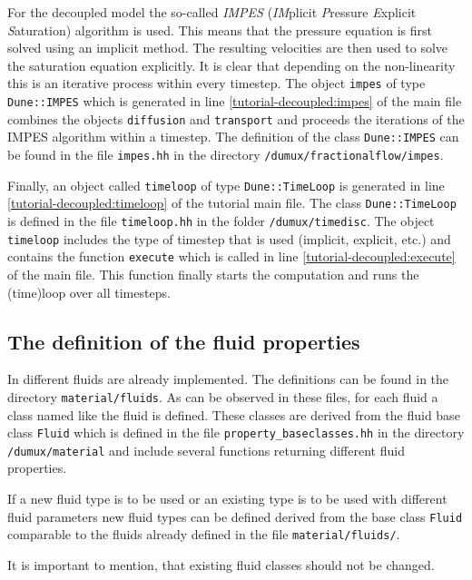 For the decoupled model the so-called \textit{IMPES} (\textit{IM}plicit \textit{P}ressure \textit{E}xplicit \textit{S}aturation) algorithm is used. This means that the pressure equation is first solved using an implicit method. The resulting velocities are then used to solve the saturation equation explicitly. It is clear that depending on the non-linearity this is an iterative process within every timestep. The object \texttt{impes} of type \texttt{Dune::IMPES} which is generated in line \ref{tutorial-decoupled:impes} of the main file combines the objects \texttt{diffusion} and \texttt{transport} and proceeds the iterations of the IMPES algorithm within a timestep. The definition of the class \texttt{Dune::IMPES} can be found in the file \texttt{impes.hh} in the directory \texttt{/dumux/fractionalflow/impes}.

Finally, an object called \texttt{timeloop} of type \texttt{Dune::TimeLoop} is generated in line \ref{tutorial-decoupled:timeloop} of the tutorial main file. The class \texttt{Dune::TimeLoop} is defined in the file \texttt{timeloop.hh} in the folder \texttt{/dumux/timedisc}. The object \texttt{timeloop} includes the type of timestep that is used (implicit, explicit, etc.) and contains the function \texttt{execute} which is called in line \ref{tutorial-decoupled:execute} of the main file. This function finally starts the computation and runs the (time)loop over all timesteps.

\subsection{The definition of the fluid properties}\label{tutorial-decoupled:description-fluid-class}

In \Dumux different fluids are already implemented. The definitions can be found in the directory \texttt{material/fluids}. As can be observed in these files, for each fluid a class named like the fluid is defined. These classes are derived from the fluid base class \texttt{Fluid} which is defined in the file \texttt{property\_baseclasses.hh} in the directory \texttt{/dumux/material} and include several functions returning different fluid properties.

If a new fluid type is to be used or an existing type is to be used with different fluid parameters new fluid types can be defined derived from the base class \texttt{Fluid} comparable to the fluids already defined in the file \texttt{material/fluids/}.

It is important to mention, that existing fluid classes should not be changed.

